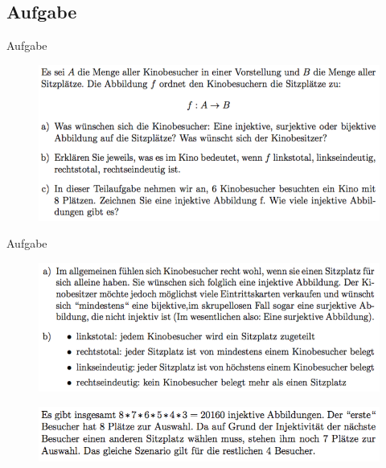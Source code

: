 \subsection{Aufgabe}
\begin{frame}{Aufgabe}
\begin{figure}[h!]
		\centering
		\includegraphics[width=\textwidth]{../topics/mengen-relationen-abbildungen/1.png} 
	\end{figure}     
\end{frame}

\begin{frame}{Aufgabe}
\begin{figure}[h!]
		\centering
		\includegraphics[width=\textwidth]{../topics/mengen-relationen-abbildungen/2.png} 
	\end{figure}  
	\begin{figure}[h!]
		\centering
		\includegraphics[width=\textwidth]{../topics/mengen-relationen-abbildungen/3.png} 
	\end{figure}   
\end{frame}